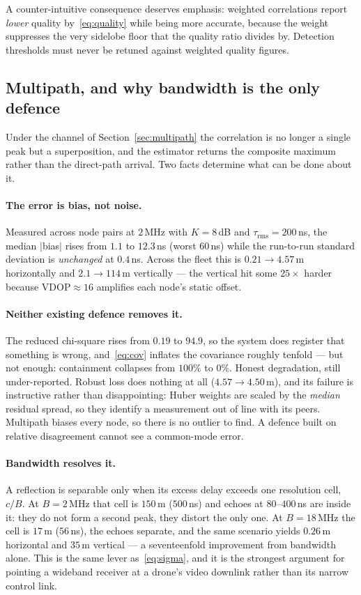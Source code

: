 \documentclass[11pt,a4paper]{article}
\begin{document}
A counter-intuitive consequence deserves emphasis: weighted correlations
report \emph{lower} quality by~\eqref{eq:quality} while being more accurate,
because the weight suppresses the very sidelobe floor that the quality ratio
divides by. Detection thresholds must never be retuned against weighted
quality figures.

\subsection{Multipath, and why bandwidth is the only defence}
\label{sec:mp-effect}

Under the channel of Section~\ref{sec:multipath} the correlation is no
longer a single peak but a superposition, and the estimator returns the
composite maximum rather than the direct-path arrival. Two facts determine
what can be done about it.

\paragraph{The error is bias, not noise.} Measured across node pairs at
$2$\,MHz with $K=8$\,dB and $\tau_{\text{rms}}=200$\,ns, the median
$|$bias$|$ rises from $1.1$ to $12.3$\,ns (worst $60$\,ns) while the
run-to-run standard deviation is \emph{unchanged} at $0.4$\,ns. Across the
fleet this is $0.21\to4.57$\,m horizontally and $2.1\to114$\,m vertically
--- the vertical hit some $25\times$ harder because $\text{VDOP}\approx16$
amplifies each node's static offset.

\paragraph{Neither existing defence removes it.} The reduced chi-square
rises from $0.19$ to $94.9$, so the system does register that something is
wrong, and~\eqref{eq:cov} inflates the covariance roughly tenfold --- but
not enough: containment collapses from $100\%$ to $0\%$. Honest
degradation, still under-reported. Robust loss does nothing at all
($4.57\to4.50$\,m), and its failure is instructive rather than
disappointing: Huber weights are scaled by the \emph{median} residual
spread, so they identify a measurement out of line with its peers.
Multipath biases every node, so there is no outlier to find. A defence
built on relative disagreement cannot see a common-mode error.

\paragraph{Bandwidth resolves it.} A reflection is separable only when its
excess delay exceeds one resolution cell, $c/B$. At $B=2$\,MHz that cell is
$150$\,m ($500$\,ns) and echoes at $80$--$400$\,ns are inside it: they do
not form a second peak, they distort the only one. At $B=18$\,MHz the cell
is $17$\,m ($56$\,ns), the echoes separate, and the same scenario yields
$0.26$\,m horizontal and $35$\,m vertical --- a seventeenfold improvement
from bandwidth alone. This is the same lever as~\eqref{eq:sigma}, and it is
the strongest argument for pointing a wideband receiver at a drone's video
downlink rather than its narrow control link.
\end{document}

